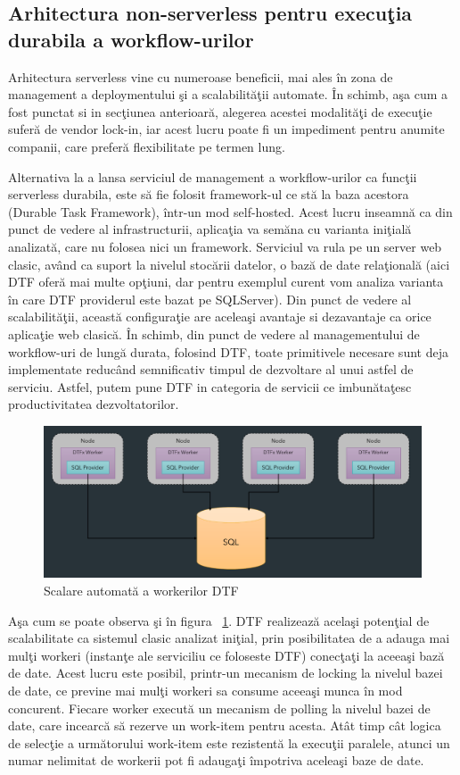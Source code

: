 \subsection{Arhitectura non-serverless pentru execuţia durabila a workflow-urilor}
\quad Arhitectura serverless vine cu numeroase beneficii, mai ales în zona de management a deploymentului şi a scalabilităţii automate. În schimb, aşa cum a fost punctat si in secţiunea anterioară, alegerea acestei modalităţi de execuţie suferă de vendor lock-in, iar acest lucru poate fi un impediment pentru anumite companii, care preferă flexibilitate pe termen lung. 
\par Alternativa la a lansa serviciul de management a workflow-urilor ca funcţii serverless durabila, este să fie folosit framework-ul ce stă la baza acestora (Durable Task Framework), într-un mod self-hosted. Acest lucru inseamnă ca din punct de vedere al infrastructurii, aplicaţia va semăna cu varianta iniţială analizată, care nu folosea nici un framework. Serviciul va rula pe un server web clasic, având ca suport la nivelul stocării datelor, o bază de date relaţională (aici DTF oferă mai multe opţiuni, dar pentru exemplul curent vom analiza varianta în care DTF providerul este bazat pe SQLServer).
Din punct de vedere al scalabilităţii, această configuraţie are aceleaşi avantaje si dezavantaje ca orice aplicaţie web clasică. În schimb, din punct de vedere al managementului de workflow-uri de lungă durata, folosind DTF, toate primitivele necesare sunt deja implementate reducând semnificativ timpul de dezvoltare al unui astfel de serviciu. Astfel, putem pune DTF in categoria de servicii ce imbunătaţesc productivitatea dezvoltatorilor.
 \begin{figure}[h]
\centering
        \includegraphics[width=1\textwidth]{images/dtf_scaling}
			 \caption{Scalare automată a workerilor DTF}
			 \label{fig:dtf-scaling}
\end{figure}
\par Aşa cum se poate observa şi în figura ~\ref{fig:dtf-scaling}. DTF realizează acelaşi potenţial de scalabilitate ca sistemul clasic analizat iniţial, prin posibilitatea de a adauga mai mulţi workeri (instanţe ale serviciliu ce foloseste DTF) conecţaţi la aceeaşi bază de date. Acest lucru este posibil, printr-un mecanism de locking la nivelul bazei de date, ce previne mai mulţi workeri sa consume aceeaşi munca în mod concurent. Fiecare worker execută un mecanism de polling la nivelul bazei de date, care incearcă să rezerve un work-item pentru acesta. Atât timp cât logica de selecţie a următorului work-item este rezistentă la execuţii paralele, atunci un numar nelimitat de workerii pot fi adaugaţi împotriva aceleaşi baze de date. 
